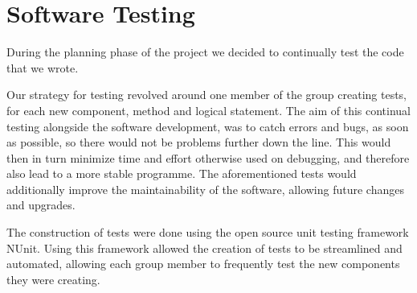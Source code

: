 \section{Software Testing}
During the planning phase of the project we decided to continually test the code that we wrote.

Our strategy for testing revolved around one member of the group creating tests, for each new component, method and logical statement.
The aim of this continual testing alongside the software development, was to catch errors and bugs, as soon as possible, so there would not be problems further down the line.
This would then in turn minimize time and effort otherwise used on debugging, and therefore also lead to a more stable programme.
The aforementioned tests would additionally improve the maintainability of the software, allowing future changes and upgrades.

The construction of tests were done using the open source unit testing framework NUnit. 
Using this framework allowed the creation of tests to be streamlined and automated, allowing each group member to frequently test the new components they were creating.

